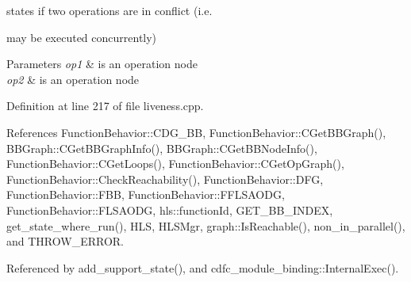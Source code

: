states if two operations are in conflict (i.\+e. 

may be executed concurrently) 
\begin{DoxyParams}{Parameters}
{\em op1} & is an operation node \\
\hline
{\em op2} & is an operation node \\
\hline
\end{DoxyParams}


Definition at line 217 of file liveness.\+cpp.



References Function\+Behavior\+::\+C\+D\+G\+\_\+\+BB, Function\+Behavior\+::\+C\+Get\+B\+B\+Graph(), B\+B\+Graph\+::\+C\+Get\+B\+B\+Graph\+Info(), B\+B\+Graph\+::\+C\+Get\+B\+B\+Node\+Info(), Function\+Behavior\+::\+C\+Get\+Loops(), Function\+Behavior\+::\+C\+Get\+Op\+Graph(), Function\+Behavior\+::\+Check\+Reachability(), Function\+Behavior\+::\+D\+FG, Function\+Behavior\+::\+F\+BB, Function\+Behavior\+::\+F\+F\+L\+S\+A\+O\+DG, Function\+Behavior\+::\+F\+L\+S\+A\+O\+DG, hls\+::function\+Id, G\+E\+T\+\_\+\+B\+B\+\_\+\+I\+N\+D\+EX, get\+\_\+state\+\_\+where\+\_\+run(), H\+LS, H\+L\+S\+Mgr, graph\+::\+Is\+Reachable(), non\+\_\+in\+\_\+parallel(), and T\+H\+R\+O\+W\+\_\+\+E\+R\+R\+OR.



Referenced by add\+\_\+support\+\_\+state(), and cdfc\+\_\+module\+\_\+binding\+::\+Internal\+Exec().

